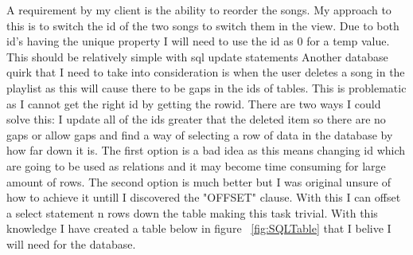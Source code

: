 \documentclass{article}
\begin{document}
A requirement by my client is the ability to reorder the songs. My approach
to this is to switch the id of the two songs to switch them in the view.
Due to both id's having the unique property I will need to use the id as
0 for a temp value. This should be relatively simple with sql update statements
Another database quirk that I need to take into consideration is when the user
deletes a song in the playlist as this will cause there to be gaps in the
ids of tables. This is problematic as I cannot get the right id by getting
the rowid. There are two ways I could solve this: I update all of the ids
greater that the deleted item so there are no gaps or allow gaps and find
a way of selecting a row of data in the database by how far down it is.
The first option is a bad idea as this means changing id which are going
to be used as relations and it may become time consuming for large
amount of rows. The second option is much better but I was original unsure
of how to achieve it untill I discovered the "OFFSET" clause. With this
I can offset a select statement n rows down the table making this task
trivial.
With this knowledge I have created a table below in figure ~\ref{fig:SQLTable}
that I belive I will need for the database.
\end{document}
